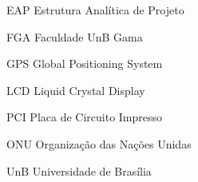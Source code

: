 \begin{siglas}
  \item[EAP] Estrutura Analítica de Projeto
  \item[FGA] Faculdade UnB Gama
  \item[GPS] Global Positioning System
  \item[LCD] Liquid Crystal Display
  \item[PCI] Placa de Circuito Impresso
  \item[ONU] Organização das Nações Unidas
  \item[UnB] Universidade de Brasília
\end{siglas}
